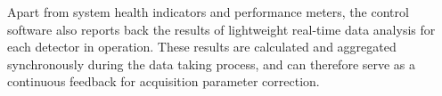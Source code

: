 Apart from system health indicators and performance meters, the control software also reports back the results of lightweight real-time data analysis for each detector in operation. These results are calculated and aggregated synchronously during the data taking process, and can therefore serve as a continuous feedback for acquisition parameter correction.
